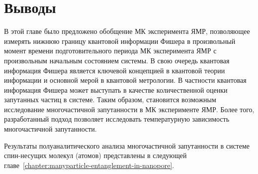 \section{Выводы}
В этой главе было предложено обобщение МК эксперимента ЯМР,
позволяющее измерять нижнюю границу квантовой информации Фишера
в произвольный момент времени подготовительного периода МК эксперимента ЯМР
с произвольным начальным состоянием системы.
В свою очередь квантовая информация Фишера является ключевой концепцией в квантовой теории информации
и основной мерой в квантовой метрологии.
В частности квантовая информация Фишера может выступать в качестве количественной оценки запутанных частиц в системе.
Таким образом, становится возможным исследование многочастичной запутанности в МК эксперименте ЯМР.
Более того, разработанный подход позволяет исследовать температурную зависимость многочастичной запутанности.

Результаты полуаналитического анализа многочастичной запутанности в системе спин-несущих молекул (атомов) представлены в следующей главе~\ref{chapter:manyparticle-entanglement-in-nanopore}.
